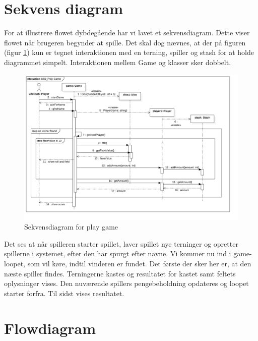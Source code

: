 \section{Sekvens diagram}

For at illustrere flowet dybdegående har vi lavet et sekvensdiagram.
Dette viser flowet når brugeren begynder at spille.
Det skal dog nævnes, at der på figuren (figur \ref{fig:sequence_diagram}) kun er tegnet interaktionen med en terning, spiller og stash for at holde diagrammet simpelt.
Interaktionen mellem Game og klasser sker dobbelt.

\begin{figure}[H]
    \begin{center}
        \includegraphics[width=15cm]{graphics/SSD_Play-Game.png}
        \caption{Sekvensdiagram for play game}
        \label{fig:sequence_diagram}
    \end{center}
\end{figure}

\noindent Det ses at når spilleren starter spillet, laver spillet nye terninger og opretter spillerne i systemet, efter den har spurgt efter navne.
Vi kommer nu ind i game-loopet, som vil køre, indtil vinderen er fundet.
Det første der sker her er, at den næste spiller findes.
Terningerne kastes og resultatet for kastet samt feltets oplysninger vises.
Den nuværende spillers pengebeholdning opdateres og loopet starter forfra.
Til sidst vises resultatet.

\newpage

\section{Flowdiagram}

